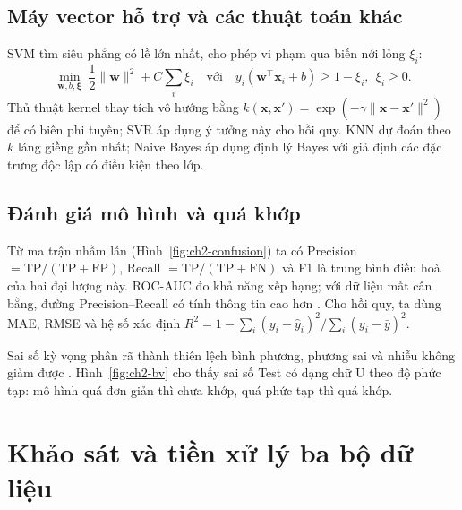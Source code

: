 \subsection{Máy vector hỗ trợ và các thuật toán khác}
SVM \cite{ch2:cortes1995} tìm siêu phẳng có lề lớn nhất, cho phép vi phạm qua biến nới lỏng $\xi_i$:
\begin{equation}
  \min_{\mathbf{w},b,\boldsymbol\xi}\ \frac12\|\mathbf{w}\|^2+C\sum_{i}\xi_i\quad\text{với}\quad y_i(\mathbf{w}^\top\mathbf{x}_i+b)\ge1-\xi_i,\ \ \xi_i\ge0.
\end{equation}
Thủ thuật kernel thay tích vô hướng bằng $k(\mathbf{x},\mathbf{x}')=\exp(-\gamma\|\mathbf{x}-\mathbf{x}'\|^2)$ để có biên phi tuyến; SVR \cite{ch2:drucker1997} áp dụng ý
tưởng này cho hồi quy. KNN \cite{ch2:cover1967} dự đoán theo $k$ láng giềng gần nhất; Naive Bayes \cite{ch2:mccallum1998} áp dụng định lý Bayes với giả
định các đặc trưng độc lập có điều kiện theo lớp.


\subsection{Đánh giá mô hình và quá khớp}
Từ ma trận nhầm lẫn (Hình~\ref{fig:ch2-confusion}) ta có Precision $=\mathrm{TP}/(\mathrm{TP}+\mathrm{FP})$, Recall $=\mathrm{TP}/(\mathrm{TP}+\mathrm{FN})$
và F1 là trung bình điều hoà của hai đại lượng này. ROC-AUC \cite{ch2:fawcett2006} đo khả năng xếp hạng; với dữ liệu mất cân bằng, đường
Precision--Recall có tính thông tin cao hơn \cite{ch2:saito2015}. Cho hồi quy, ta dùng MAE, RMSE và hệ số xác định $R^2=1-\sum_i(y_i-\hat y_i)^2/\sum_i(y_i-\bar y)^2$.


Sai số kỳ vọng phân rã thành thiên lệch bình phương, phương sai và nhiễu không giảm được \cite{ch2:geman1992}. Hình~\ref{fig:ch2-bv} cho thấy
sai số Test có dạng chữ U theo độ phức tạp: mô hình quá đơn giản thì chưa khớp, quá phức tạp thì quá khớp.


\section{Khảo sát và tiền xử lý ba bộ dữ liệu}\label{sec:ml-data}
